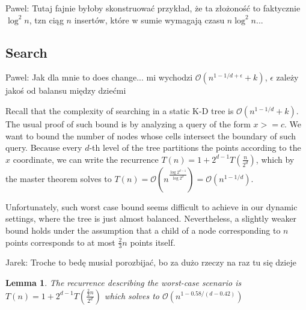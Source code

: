 \documentclass[10pt,a4paper]{article}
\newtheorem{lemma}{Lemma}
\newcommand{\pawel}[1]{\noindent\colorbox{myRed}{Pawel: #1}}
\newcommand{\jarek}[1]{\noindent\colorbox{myYellow}{Jarek: #1}}
\newcommand{\Oh}{\mathcal{O}}
\begin{document}
\pawel{Tutaj fajnie byłoby skonstruować przykład, że ta złożoność to faktycznie $\log^{2}n$, tzn ciąg $n$ insertów, które w sumie wymagają czasu $n\log^{2}n$...}

\subsection{Search}
\pawel{Jak dla mnie to does change... mi wychodzi $\Oh(n^{1-1/d+\epsilon}+k)$, $\epsilon$ zależy jakoś od balansu między dziećmi}

Recall that the complexity of searching in a static K-D tree is $\Oh(n^{1-1/d} + k)$. The usual proof of such bound is by analyzing a query of the form $x>=c$. We want to bound the number of nodes whose cells intersect the boundary of such query. Because every $d$-th level of the tree partitions the points according to the $x$ coordinate, we can write the recurrence $T(n)=1+2^{d-1}T(\frac{n}{2^{d}})$, which by the master theorem solves to $T(n)=\Oh(n^{\frac{\log 2^{d-1}}{\log 2^{d}}})=\Oh(n^{1-1/d})$. 

Unfortunately, such worst case bound seems difficult to achieve in our dynamic settings, where the tree is just almost balanced. Nevertheless, a slightly weaker bound holds under the assumption that a child of a node corresponding to $n$ points corresponds to at most $\frac{2}{3}n$ points itself.

\jarek{Troche to bedę musiał porozbijać, bo za dużo rzeczy na raz tu się dzieje}
\begin{lemma}\label{lem:3}
The recurrence describing the worst-case scenario is $T(n)=1+2^{d-1}T(\frac{\frac{2}{3}n}{2^d})$ which solves to $\Oh(n^{1-0.58/(d-0.42)})$
\end{lemma}
\end{document}
